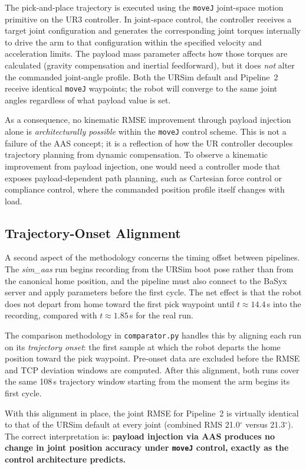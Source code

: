 The pick-and-place trajectory is executed using the \texttt{moveJ} joint-space motion primitive
on the UR3 controller.
In joint-space control, the controller receives a target joint configuration and generates the
corresponding joint torques internally to drive the arm to that configuration within the specified
velocity and acceleration limits.
The payload mass parameter affects how those torques are calculated (gravity compensation and
inertial feedforward), but it does \emph{not} alter the commanded joint-angle profile.
Both the URSim default and Pipeline~2 receive identical \texttt{moveJ} waypoints; the robot will
converge to the same joint angles regardless of what payload value is set.

As a consequence, no kinematic RMSE improvement through payload injection alone is
\emph{architecturally possible} within the \texttt{moveJ} control scheme.
This is not a failure of the AAS concept; it is a reflection of how the UR controller decouples
trajectory planning from dynamic compensation.
To observe a kinematic improvement from payload injection, one would need a controller mode that
exposes payload-dependent path planning, such as Cartesian force control or compliance control,
where the commanded position profile itself changes with load.

\subsection{Trajectory-Onset Alignment}

A second aspect of the methodology concerns the timing offset between pipelines.
The \textit{sim\_aas} run begins recording from the URSim boot pose rather than from the
canonical home position, and the pipeline must also connect to the BaSyx server and apply
parameters before the first cycle.
The net effect is that the robot does not depart from home toward the first pick waypoint
until $t \approx 14.4$\,s into the recording, compared with $t \approx 1.85$\,s for the
real run.

The comparison methodology in \texttt{comparator.py} handles this by aligning each run on its
\emph{trajectory onset}: the first sample at which the robot departs the home position toward
the pick waypoint.
Pre-onset data are excluded before the RMSE and TCP deviation windows are computed.
After this alignment, both runs cover the same 108\,s trajectory window starting from the
moment the arm begins its first cycle.

With this alignment in place, the joint RMSE for Pipeline~2 is virtually identical to
that of the URSim default at every joint (combined RMS 21.0$^\circ$ versus 21.3$^\circ$).
The correct interpretation is: \textbf{payload injection via AAS produces no change in joint
position accuracy under \texttt{moveJ} control, exactly as the control architecture predicts.}


